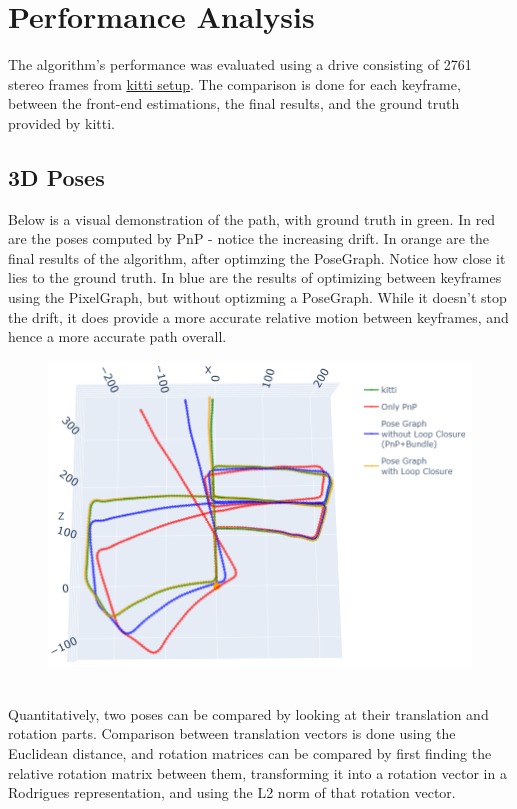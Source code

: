 \documentclass[12pt]{article}
\begin{document}
\section{Performance Analysis}
The algorithm's performance was evaluated using a drive consisting of 2761 stereo frames from \href{http://www.cvlibs.net/datasets/kitti/setup.php}{kitti setup}. The comparison is done for each keyframe, between the front-end estimations, the final results, and the ground truth provided by kitti. 
\subsection{3D Poses}
Below is a visual demonstration of the path, with ground truth in green. In red are the poses computed by PnP - notice the increasing drift. In orange are the final results of the algorithm, after optimzing the PoseGraph. Notice how close it lies to the ground truth. In blue are the results of optimizing between keyframes using the PixelGraph, but without optizming a PoseGraph. While it doesn't stop the drift, it does provide a more accurate relative motion between keyframes, and hence a more accurate path overall.
\begin{figure}[h]
\centering \includegraphics[width=\textwidth]{3D-locations}
\end{figure} \\
Quantitatively, two poses can be compared by looking at their translation and rotation parts. Comparison between translation vectors is done using the Euclidean distance, and rotation matrices can be compared by first finding the relative rotation matrix between them, transforming it into a rotation vector in a Rodrigues representation, and using the L2 norm of that rotation vector. 
\newpage
\end{document}
